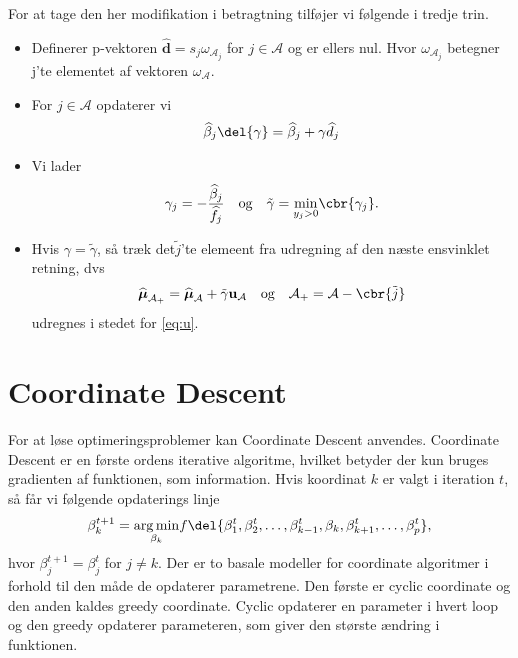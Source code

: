 For at tage den her modifikation i betragtning tilføjer vi følgende i tredje trin. 
\begin{itemize}
\item Definerer p-vektoren $\widehat{\textbf{d}} = s_j \omega_{\mathcal{A}_j}$ for $j \in \mathcal{A}$ og er ellers nul. Hvor $ \omega_{\mathcal{A}_j}$ betegner j'te elementet af vektoren $\omega_{\mathcal{A}}$. 
\item For $j \in \mathcal{A}$ opdaterer vi 
\begin{align*}
\widehat{\beta}_j \del{\gamma} = \widehat{\beta}_j + \gamma \widehat{d}_j 
\end{align*}
\item Vi lader 
\begin{align*}
\gamma_j = - \frac{\widehat{\beta}_j}{\widehat{f}_j} \quad \text{og} \quad \tilde\gamma = \underset{y_j > 0}{\min} \cbr{\gamma_j}. 
\end{align*}
\item Hvis $\gamma = \tilde{\gamma}$, så træk det$ \tilde{j}$'te elemeent fra udregning af den næste ensvinklet retning, dvs 
\begin{align*}
\widehat{\boldsymbol\mu}_{\mathcal{A}_+} = \widehat{\boldsymbol\mu}_\mathcal{A} + \tilde{\gamma} \textbf{u}_\mathcal{A} \quad \text{og} \quad \mathcal{A_+} = \mathcal{A}- \cbr{\tilde{j}}
\end{align*}
udregnes i stedet for \eqref{eq:u}.
\end{itemize}


\section{Coordinate Descent}
For at løse optimeringsproblemer kan Coordinate Descent anvendes. 
Coordinate Descent er en første ordens iterative algoritme, hvilket betyder der kun bruges gradienten af funktionen, som information. 
Hvis koordinat $k$ er valgt i iteration $t$, så får vi følgende opdaterings linje
\begin{align*}
\beta_k^{t+1} =\underset{ \beta_k}{\arg \min}  f\del{ \beta_1^t, \beta_2^t, \dots, \beta_{k-1}^t, \beta_k, \beta_{k+1}^t, \dots, \beta_p^t  },
\end{align*}
hvor $\beta_j^{t+1} = \beta_j^t$ for $j \neq k$. 
Der er to basale modeller for coordinate algoritmer i forhold til den måde de opdaterer parametrene. Den første er cyclic coordinate og den anden kaldes greedy coordinate. 
Cyclic opdaterer en parameter i hvert loop og den greedy opdaterer parameteren, som giver den største ændring i funktionen. 

